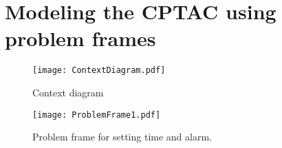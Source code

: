 \documentclass[Main_Assignment2]{subfiles}
\begin{document}
\section{Modeling the CPTAC using problem frames}


\begin{figure}[H]
\centering
\texttt{[image: ContextDiagram.pdf]}
\caption{Context diagram}
\label{fig:contextDiagram}
\end{figure}

\begin{figure}[H]
\centering
\texttt{[image: ProblemFrame1.pdf]}
\caption{Problem frame for setting time and alarm.}
\label{fig:problemFrame}
\end{figure}
\end{document}
